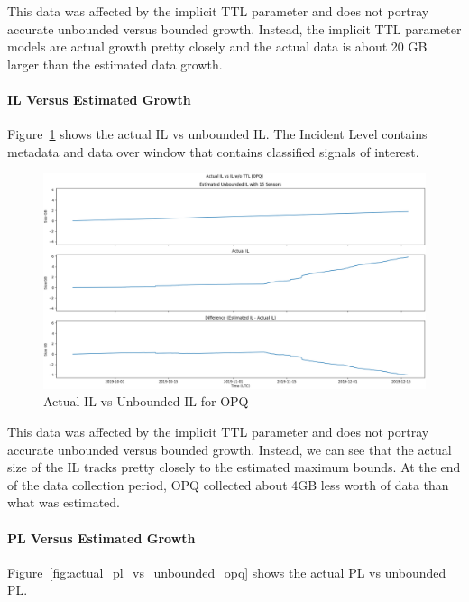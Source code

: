 This data was affected by the implicit TTL parameter and does not portray accurate unbounded versus bounded growth. Instead, the implicit TTL parameter models are actual growth pretty closely and the actual data is about 20 GB larger than the estimated data growth.

\paragraph{IL Versus Estimated Growth}
Figure~\ref{fig:actual_il_vs_unbounded_opq} shows the actual IL vs unbounded IL. The Incident Level contains metadata and data over window that contains classified signals of interest.

\begin{figure}[H]
    \centering
    \includegraphics[width=\linewidth]{figures/actual_il_vs_unbounded_opq.png}
    \caption{Actual IL vs Unbounded IL for OPQ}
    \label{fig:actual_il_vs_unbounded_opq}
\end{figure}

This data was affected by the implicit TTL parameter and does not portray accurate unbounded versus bounded growth. Instead, we can see that the actual size of the IL tracks pretty closely to the estimated maximum bounds. At the end of the data collection period, OPQ collected about 4GB less worth of data than what was estimated.

\paragraph{PL Versus Estimated Growth}
Figure~\ref{fig:actual_pl_vs_unbounded_opq} shows the actual PL vs unbounded PL.

